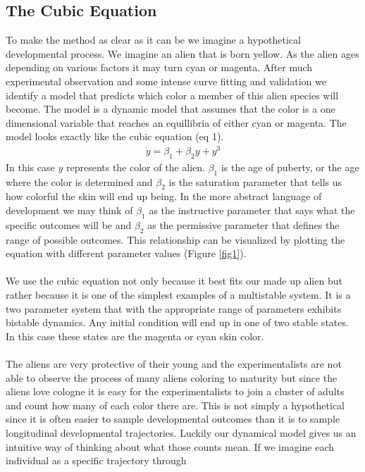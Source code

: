 \documentclass[letterpaper]{article}
\begin{document}
\subsection{The Cubic Equation}
To make the method as clear as it can be we imagine a hypothetical developmental
process. We imagine an alien that is born yellow. As the alien ages depending
on various factors it may turn cyan or magenta. After much experimental observation
and some intense curve fitting and validation we identify a model that predicts 
which color a member of this alien species will become. The model is a dynamic
model that assumes that the color is a one dimensional variable that reaches 
an equillibria of either cyan or magenta. The model looks exactly like the cubic 
equation (eq 1).
\begin{eqnarray}
    \dot{y} = \beta_1 + \beta_2 y + y^3
\end{eqnarray}
In this case $y$ represents the color of the alien. $\beta_1$ is the age of puberty,
or the age where the color is determined and $\beta_2$ is the saturation parameter that
tells us how colorful the skin will end up being. In the more abstract language of
development we may think of $\beta_1$ as the instructive parameter that says what the
specific outcomes will be and $\beta_2$ as the permissive parameter that defines the
range of possible outcomes. This relationship can be visualized by plotting the 
equation with different parameter values (Figure \ref{fig1}).\\\\
We use the cubic equation not only because it best fits our made up alien but rather
because it is one of the simplest examples of a multistable system. It is a 
two parameter system that with the appropriate range of parameters exhibits bistable
dynamics. Any initial condition will end up in one of two stable states. In this
case these states are the magenta or cyan skin color.\\\\
The aliens are very protective of their young and the experimentalists are not able
to observe the process of many aliens coloring to maturity but since the aliens love
cologne it is easy for the experimentalists to join a cluster of adults and count
how many of each color there are. This is not simply a hypothetical since it is often
easier to sample developmental outcomes than it is to sample longitudinal developmental
trajectories. Luckily our dynamical model gives us an intuitive way of thinking about
what those counts mean. If we imagine each individual as a specific trajectory through
\end{document}
